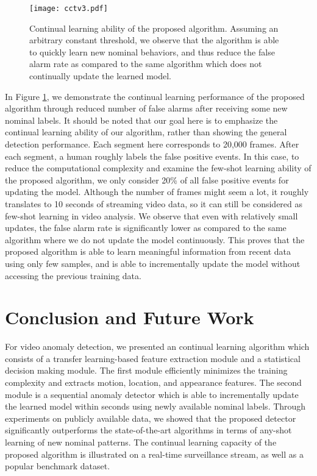 \begin{figure}[th]
\centering
\texttt{[image: cctv3.pdf]}
\vspace{-2mm}
\caption{Continual learning ability of the proposed algorithm. Assuming an arbitrary constant threshold, we observe that the algorithm is able to quickly learn new nominal behaviors, and thus reduce the false alarm rate as compared to the same algorithm which does not continually update the learned model.}
\label{f:cctv}
\vspace{-2mm}
\end{figure}


In Figure \ref{f:cctv}, we demonstrate the continual learning performance of the proposed algorithm through reduced number of false alarms after receiving some new nominal labels.
It should be noted that our goal here is to emphasize the continual learning ability of our algorithm, rather than showing the general detection performance. Each
segment here corresponds to 20,000 frames. After each segment, a human roughly labels the false positive events. In this case, to reduce the computational complexity and examine the few-shot learning ability of the proposed algorithm, we only consider 20\% of all false positive events for updating the model. Although the number of frames might seem a lot, it roughly translates to 10 seconds of streaming video data, so it can still be considered as few-shot learning in video analysis. We observe that even with relatively small updates, the false alarm rate is significantly lower as compared to the same algorithm where we do not update the model continuously. This proves that the proposed algorithm is able to learn meaningful information from recent data using only few samples, and is able to incrementally update the model without accessing the previous training data.   

\section{Conclusion and Future Work}
\label{s:conclusion}

For video anomaly detection, we presented an continual learning algorithm which consists of a transfer learning-based feature extraction module and a statistical decision making module. The first module efficiently minimizes the training complexity and extracts motion, location, and appearance features. The second module is a sequential anomaly detector which is able to incrementally update the learned model within seconds using newly available nominal labels. Through experiments on publicly available data, we showed that the proposed detector significantly outperforms the state-of-the-art algorithms in terms of any-shot learning of new nominal patterns. The continual learning capacity of the proposed algorithm is illustrated on a real-time surveillance stream, as well as a popular benchmark dataset. 

